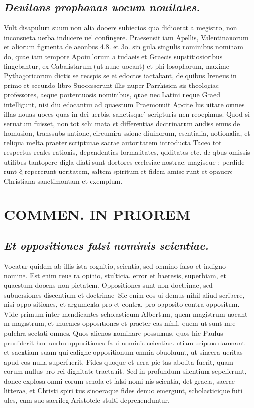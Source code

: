 \documentclass{article}
\begin{document}
\begin{pages}
\subsection*{\textit{Deuitans prophanas uocum nouitates. }}\pstart Vult disapulum suum non alia dooere subiectos qua didioerat a megistro, non inconsueta uerba inducere uel confingere. Praesensit iam Apellis, Valentinanorum et aliorum figmenta de aeonbus 4.8. et 3o. sin gula singulis nominibus nominam do, quae iam tempore Apoiu lorum a tudaeis et Graecis supstitiosioribus fingebantur, ex Cabalistarum (ut nune uocant) et phi losophorum, maxime Pythagoricorum dictis se recepis se et edoctos iactabant, de quibus Ireneus in primo et secundo libro Suoeesserunt illis nuper Parrhisien sis theologiae professores, aeque portentuosis nominibus, quae nec Latini neque Graed intelligunt, nisi diu edocantur ad quaestum Praemonuit Apoite lus uitare omnes illas nouas uoces quas in dei uerbis, sanctisque ́ scripturis non reoepimus. Quod si seruatum fuisset, non tot schi mata et differentias doctrinarum audiss emus de homusion, transsubs antione, circumira ssione diuinorum, esentialia, uotionalia, et reliqua melta praeter scripturae sacrae autoritatem introducta Taceo tot respectus reales rationis, dependentias formalitates, qdditates etc. de qbus omissis utilibus tantopere digla diati sunt doctores ecclesiae nostrae, magisque ; perdide runt q̃ repererunt ueritatem, saltem spiritum et fidem amise runt et opauere Christiana sanctimontam et exemplum.  \pend
\section*{COMMEN. IN PRIOREM }
\marginpar{[ p.188 ]}
{}
\subsection*{\textit{Et oppositiones falsi nominis scientiae. }}\pstart Vocatur quidem ab illis ista cognitio, scientia, sed omnino falso et indigno nomine. Est enim reue ra opinio, stulticia, error et haeresis, superbiam, et quaestum dooens non pietatem. Oppositiones sunt non doctrinae, sed subuersiones discentium et doctrinae. Sic enim eos ui demus nihil aliud scribere, nisi oppo sitiones, et argumenta pro et contra, pro opposito contra oppositum. Vide primum inter mendicantes scholasticum Albertum, quem magistrum uocant in magistrum, et inuenies oppositiones et praeter cas nihil, quem ut sunt inre pulchra sectati omnes. Quos alienos nominare possumus, quos hic Paulus prodiderit hoc uerbo oppositiones falsi nominis scientiae. etiam seipsos damnant et saentiam suam qui caligne oppositionum omnia obuoluunt, ut sincera ueritas apud eos nulla superfuerit. Fides quoque et uera pie tas abolita fuerit, quam eorum nullus pro rei dignitate tractauit. Sed in profundum silentium sepelierunt, donec explosa omni corum schola et falsi nomi nis scientia, det gracia, sacrae litterae, et Christi spiri tus sinoeraque fides denuo emergunt, scholasticique futi ules, cum suo sacrileg Aristotele stulti deprehenduntur.  \pend

\end{pages}
\end{document}
